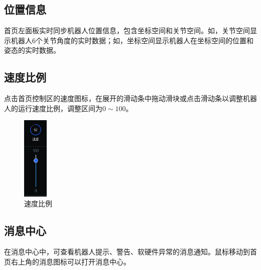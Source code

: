 \vspace*{-2em}

\subsection{位置信息}
\LM 首页左面板实时同步机器人位置信息，包含坐标空间和关节空间。如，关节空间显示机器人6个关节角度的实时数据；如，坐标空间显示机器人在坐标空间的位置和姿态的实时数据。

\subsection{速度比例}
点击\LM 首页控制区的速度图标，在展开的滑动条中拖动滑块或点击滑动条以调整机器人的运行速度比例，调整区间为$0\sim 100$。

\begin{figure}[ht]
	\centering
	\includegraphics[height=4cm]{screen/2-13.png}
	\caption{速度比例}
	\label{fig:速度比例}
\end{figure}

\subsection{消息中心}
在消息中心中，可查看机器人提示、警告、软硬件异常的消息通知。鼠标移动到\LM 首页右上角的消息图标\colorbox{black}{}可以打开消息中心。

